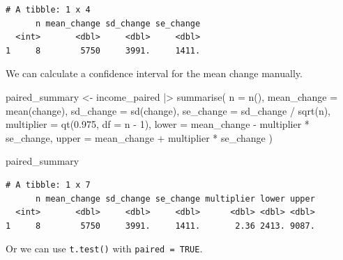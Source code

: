 \documentclass[
  letterpaper,
  DIV=11,
  numbers=noendperiod]{scrreprt}
\newenvironment{Shaded}{\begin{snugshade}}{\end{snugshade}}
\newcommand{\AttributeTok}[1]{\textcolor[rgb]{0.40,0.45,0.13}{#1}}
\newcommand{\ConstantTok}[1]{\textcolor[rgb]{0.56,0.35,0.01}{#1}}
\newcommand{\DecValTok}[1]{\textcolor[rgb]{0.68,0.00,0.00}{#1}}
\newcommand{\FloatTok}[1]{\textcolor[rgb]{0.68,0.00,0.00}{#1}}
\newcommand{\FunctionTok}[1]{\textcolor[rgb]{0.28,0.35,0.67}{#1}}
\newcommand{\NormalTok}[1]{\textcolor[rgb]{0.00,0.23,0.31}{#1}}
\newcommand{\OtherTok}[1]{\textcolor[rgb]{0.00,0.23,0.31}{#1}}
\newcommand{\SpecialCharTok}[1]{\textcolor[rgb]{0.37,0.37,0.37}{#1}}
\begin{document}
\begin{verbatim}
# A tibble: 1 x 4
      n mean_change sd_change se_change
  <int>       <dbl>     <dbl>     <dbl>
1     8        5750     3991.     1411.
\end{verbatim}

We can calculate a confidence interval for the mean change manually.

\begin{Shaded}
\begin{Highlighting}[]
\NormalTok{paired\_summary }\OtherTok{\textless{}{-}}\NormalTok{ income\_paired }\SpecialCharTok{|\textgreater{}}
  \FunctionTok{summarise}\NormalTok{(}
    \AttributeTok{n =} \FunctionTok{n}\NormalTok{(),}
    \AttributeTok{mean\_change =} \FunctionTok{mean}\NormalTok{(change),}
    \AttributeTok{sd\_change =} \FunctionTok{sd}\NormalTok{(change),}
    \AttributeTok{se\_change =}\NormalTok{ sd\_change }\SpecialCharTok{/} \FunctionTok{sqrt}\NormalTok{(n),}
    \AttributeTok{multiplier =} \FunctionTok{qt}\NormalTok{(}\FloatTok{0.975}\NormalTok{, }\AttributeTok{df =}\NormalTok{ n }\SpecialCharTok{{-}} \DecValTok{1}\NormalTok{),}
    \AttributeTok{lower =}\NormalTok{ mean\_change }\SpecialCharTok{{-}}\NormalTok{ multiplier }\SpecialCharTok{*}\NormalTok{ se\_change,}
    \AttributeTok{upper =}\NormalTok{ mean\_change }\SpecialCharTok{+}\NormalTok{ multiplier }\SpecialCharTok{*}\NormalTok{ se\_change}
\NormalTok{  )}

\NormalTok{paired\_summary}
\end{Highlighting}
\end{Shaded}

\begin{verbatim}
# A tibble: 1 x 7
      n mean_change sd_change se_change multiplier lower upper
  <int>       <dbl>     <dbl>     <dbl>      <dbl> <dbl> <dbl>
1     8        5750     3991.     1411.       2.36 2413. 9087.
\end{verbatim}

Or we can use \texttt{t.test()} with \texttt{paired\ =\ TRUE}.

\begin{Shaded}
\end{Shaded}
\end{document}
